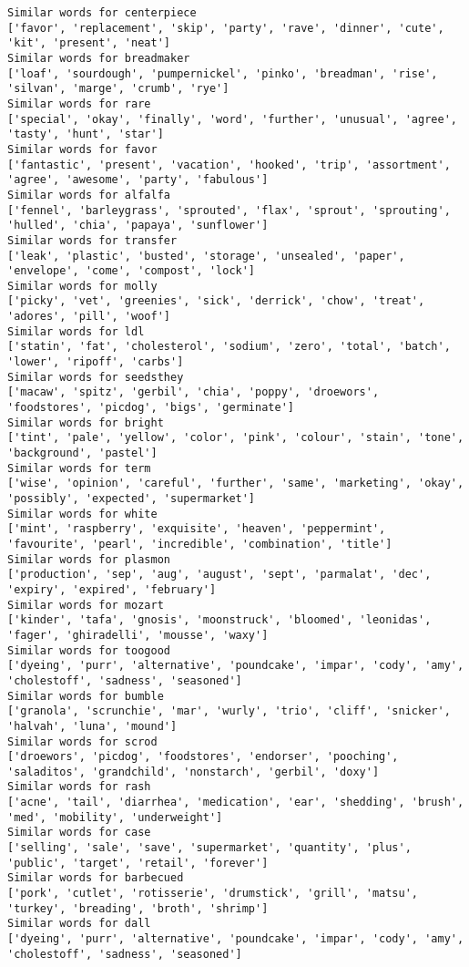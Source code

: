 \documentclass[11pt]{article}
\begin{document}
\begin{Verbatim}[commandchars=\\\{\}]
Similar words for centerpiece
['favor', 'replacement', 'skip', 'party', 'rave', 'dinner', 'cute', 'kit', 'present', 'neat']
Similar words for breadmaker
['loaf', 'sourdough', 'pumpernickel', 'pinko', 'breadman', 'rise', 'silvan', 'marge', 'crumb', 'rye']
Similar words for rare
['special', 'okay', 'finally', 'word', 'further', 'unusual', 'agree', 'tasty', 'hunt', 'star']
Similar words for favor
['fantastic', 'present', 'vacation', 'hooked', 'trip', 'assortment', 'agree', 'awesome', 'party', 'fabulous']
Similar words for alfalfa
['fennel', 'barleygrass', 'sprouted', 'flax', 'sprout', 'sprouting', 'hulled', 'chia', 'papaya', 'sunflower']
Similar words for transfer
['leak', 'plastic', 'busted', 'storage', 'unsealed', 'paper', 'envelope', 'come', 'compost', 'lock']
Similar words for molly
['picky', 'vet', 'greenies', 'sick', 'derrick', 'chow', 'treat', 'adores', 'pill', 'woof']
Similar words for ldl
['statin', 'fat', 'cholesterol', 'sodium', 'zero', 'total', 'batch', 'lower', 'ripoff', 'carbs']
Similar words for seedsthey
['macaw', 'spitz', 'gerbil', 'chia', 'poppy', 'droewors', 'foodstores', 'picdog', 'bigs', 'germinate']
Similar words for bright
['tint', 'pale', 'yellow', 'color', 'pink', 'colour', 'stain', 'tone', 'background', 'pastel']
Similar words for term
['wise', 'opinion', 'careful', 'further', 'same', 'marketing', 'okay', 'possibly', 'expected', 'supermarket']
Similar words for white
['mint', 'raspberry', 'exquisite', 'heaven', 'peppermint', 'favourite', 'pearl', 'incredible', 'combination', 'title']
Similar words for plasmon
['production', 'sep', 'aug', 'august', 'sept', 'parmalat', 'dec', 'expiry', 'expired', 'february']
Similar words for mozart
['kinder', 'tafa', 'gnosis', 'moonstruck', 'bloomed', 'leonidas', 'fager', 'ghiradelli', 'mousse', 'waxy']
Similar words for toogood
['dyeing', 'purr', 'alternative', 'poundcake', 'impar', 'cody', 'amy', 'cholestoff', 'sadness', 'seasoned']
Similar words for bumble
['granola', 'scrunchie', 'mar', 'wurly', 'trio', 'cliff', 'snicker', 'halvah', 'luna', 'mound']
Similar words for scrod
['droewors', 'picdog', 'foodstores', 'endorser', 'pooching', 'saladitos', 'grandchild', 'nonstarch', 'gerbil', 'doxy']
Similar words for rash
['acne', 'tail', 'diarrhea', 'medication', 'ear', 'shedding', 'brush', 'med', 'mobility', 'underweight']
Similar words for case
['selling', 'sale', 'save', 'supermarket', 'quantity', 'plus', 'public', 'target', 'retail', 'forever']
Similar words for barbecued
['pork', 'cutlet', 'rotisserie', 'drumstick', 'grill', 'matsu', 'turkey', 'breading', 'broth', 'shrimp']
Similar words for dall
['dyeing', 'purr', 'alternative', 'poundcake', 'impar', 'cody', 'amy', 'cholestoff', 'sadness', 'seasoned']

\end{Verbatim}
\end{document}
